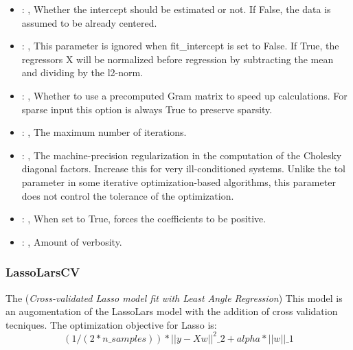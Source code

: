 \begin{itemize}
    \item {}: , 
      Whether the intercept should be estimated or not. If False,
      the data is assumed to be already centered.

    \item {}: , 
      This parameter is ignored when fit\_intercept is set to False. If True,
      the regressors X will be normalized before regression by subtracting the mean and
      dividing by the l2-norm.

    \item {}: , 
      Whether to use a precomputed Gram matrix to speed up calculations.
      For sparse input this option is always True to preserve sparsity.

    \item {}: , 
      The maximum number of iterations.

    \item {}: , 
      The machine-precision regularization in the computation of the Cholesky
      diagonal factors. Increase this for very ill-conditioned systems. Unlike the tol
      parameter in some iterative optimization-based algorithms, this parameter does not
      control the tolerance of the optimization.

    \item {}: , 
      When set to True, forces the coefficients to be positive.

    \item {}: , 
      Amount of verbosity.
  \end{itemize}


\subsubsection{LassoLarsCV}
  The  (\textit{Cross-validated Lasso model fit with Least Angle Regression})
  This model is an augomentation of the LassoLars model with the addition of
  cross validation tecniques.                         The optimization objective for Lasso is:
  \begin{equation}                          (1 / (2 * n\_samples)) * ||y - Xw||^2\_2 + alpha *
  ||w||\_1                         \end{equation}

